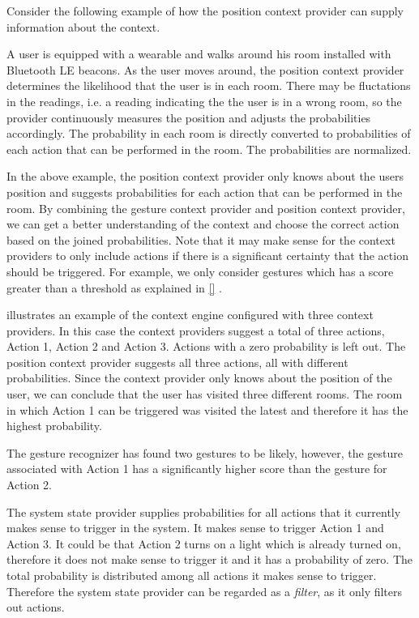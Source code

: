 Consider the following example of how the position context provider can supply information about the context.

\begin{testexample}
A user is equipped with a wearable and walks around his room installed with Bluetooth LE beacons. As the user moves around, the position context provider determines the likelihood that the user is in each room. There may be fluctations in the readings, i.e. a reading indicating the the user is in a wrong room, so the provider continuously measures the position and adjusts the probabilities accordingly.
The probability in each room is directly converted to probabilities of each action that can be performed in the room. The probabilities are normalized.
\end{testexample}

In the above example, the position context provider only knows about the users position and suggests probabilities for each action that can be performed in the room. By combining the gesture context provider and position context provider, we can get a better understanding of the context and choose the correct action based on the joined probabilities. Note that it may make sense for the context providers to only include actions if there is a significant certainty that the action should be triggered. For example, we only consider gestures which has a score greater than a threshold as explained in \cref{} .

 illustrates an example of the context engine configured with three context providers. In this case the context providers suggest a total of three actions, Action 1, Action 2 and Action 3. Actions with a zero probability is left out. The position context provider suggests all three actions, all with different probabilities. Since the context provider only knows about the position of the user, we can conclude that the user has visited three different rooms. The room in which Action 1 can be triggered was visited the latest and therefore it has the highest probability.

The gesture recognizer has found two gestures to be likely, however, the gesture associated with Action 1 has a significantly higher score than the gesture for Action 2.

The system state provider supplies probabilities for all actions that it currently makes sense to trigger in the system. It makes sense to trigger Action 1 and Action 3. It could be that Action 2 turns on a light which is already turned on, therefore it does not make sense to trigger it and it has a probability of zero. The total probability is distributed among all actions it makes sense to trigger. Therefore the system state provider can be regarded as a \textit{filter}, as it only filters out actions.

